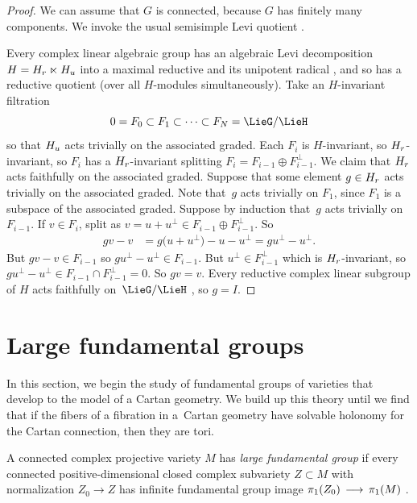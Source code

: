 \documentclass[11pt]{article}
\numberwithin{equation}{section}
\numberwithin{equation}{section}
\begin{document}
\begin{proof}
We can assume that $G$ is connected, because $G$ has finitely many components.
We invoke the usual semisimple Levi quotient \cite[p. 20]{Vinberg:1994}.

Every complex linear algebraic group has an algebraic Levi decomposition $H = \red{H} \ltimes \urad{H}$ into a maximal reductive and its unipotent radical \cite[Theorem 4.3]{Hochschild:1981}, and so has a reductive quotient (over all $H$-modules simultaneously).
Take an $H$-invariant filtration \[0 = F_0 \subset F_1 \subset \cdots
 \subset F_N = \LieG/\LieH\] so that $\urad{H}$ acts trivially on the associated graded.
Each $F_i$ is $H$-invariant, so $\red{H}$-invariant, so $F_i$ has a $\red{H}$-invariant splitting $F_i=F_{i-1} \oplus F_{i-1}^{\perp}$.
We claim that $\red{H}$ acts faithfully on the associated graded.
Suppose that some element $g \in \red{H}$ acts trivially on the associated graded.
Note that~$g$ acts trivially on $F_1$, since $F_1$ is a subspace of the associated graded.
Suppose by induction that~$g$ acts trivially on $F_{i-1}$.
If $v \in F_i$, split as $v=u+u^{\perp}\in F_{i-1}\oplus F_{i-1}^{\perp}$.
So
\begin{align*}
gv-v
&=
g\bigl(u+u^{\perp}\bigr)-u-u^{\perp}=
gu^{\perp}-u^{\perp}.
\end{align*}
But $gv-v \in F_{i-1}$ so $gu^{\perp}-u^{\perp} \in F_{i-1}$.
But $u^{\perp} \in F_{i-1}^{\perp}$ which is $\red{H}$-invariant, so $gu^{\perp}-u^{\perp} \in F_{i-1} \cap F_{i-1}^{\perp}=0$.
So $gv = v$.
Every reductive complex linear subgroup of $H$ acts faithfully on~$\LieG/\LieH$ \cite[Lemma~6.1]{McKay2013}, so $g = I$.
\end{proof}

\setcounter{section}{13}
\section{Large fundamental groups}\label{section:Large.fundamental.groups}
In this section, we begin the study of fundamental groups of varieties that develop to the model of a Cartan geometry.
We build up this theory until we find that if the fibers of a fibration in a~Cartan geometry have solvable holonomy for the Cartan connection, then they are tori.

A connected complex projective variety $M$ has \emph{large fundamental group} if every connected positive-dimensional closed
complex subvariety $Z \subset M$ with normalization $Z_0 \to Z$ has infinite fundamental group image $\pi_{1}({Z_0}) \,\longrightarrow\, \pi_{1}({M})$ \cite{Kollar:1993}.
\end{document}
